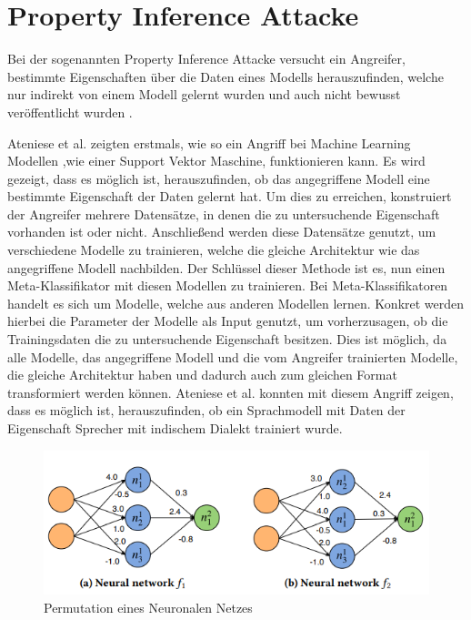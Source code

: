 \section{Property Inference Attacke}\label{sec:property_inference}

Bei der sogenannten Property Inference Attacke versucht ein Angreifer, bestimmte Eigenschaften über die Daten eines Modells herauszufinden, welche nur indirekt von einem Modell gelernt wurden und auch nicht bewusst veröffentlicht wurden \cite{P-80}.

Ateniese et al. \cite{P-80} zeigten erstmals, wie so ein Angriff bei Machine Learning Modellen ,wie einer Support Vektor Maschine, funktionieren kann.
Es wird gezeigt, dass es möglich ist, herauszufinden, ob das angegriffene Modell eine bestimmte Eigenschaft der Daten gelernt hat. 
Um dies zu erreichen, konstruiert der Angreifer mehrere Datensätze, in denen die zu untersuchende Eigenschaft vorhanden ist oder nicht. 
Anschließend werden diese Datensätze genutzt, um verschiedene Modelle zu trainieren, welche die gleiche Architektur wie das angegriffene Modell nachbilden.
Der Schlüssel dieser Methode ist es, nun einen Meta-Klassifikator mit diesen Modellen zu trainieren.
Bei Meta-Klassifikatoren handelt es sich um Modelle, welche aus anderen Modellen lernen. 
Konkret werden hierbei die Parameter der Modelle als Input genutzt, um vorherzusagen, ob die Trainingsdaten die zu untersuchende Eigenschaft besitzen. 
Dies ist möglich, da alle Modelle, das angegriffene Modell und die vom Angreifer trainierten Modelle, die gleiche Architektur haben und dadurch auch zum gleichen Format transformiert werden können.
Ateniese et al. konnten mit diesem Angriff zeigen, dass es möglich ist, herauszufinden, ob ein Sprachmodell mit Daten der Eigenschaft \dq Sprecher mit indischem Dialekt \dq trainiert wurde. 

\begin{figure}[!htb]
    \centering
    \includegraphics[width=12cm]{figures/permutation_invariance}
    \caption{Permutation eines Neuronalen Netzes \cite{P-11}}
    \label{fig:permutation_invariance}
\end{figure} 

